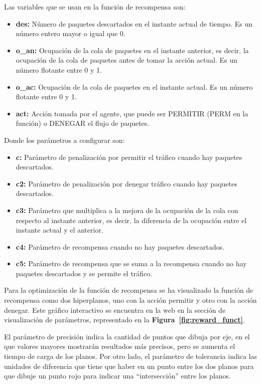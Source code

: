 Las variables que se usan en la función de recompensa son:
\begin{itemize}
    \item \textbf{des:} Número de paquetes descartados en el instante actual de tiempo. Es un número entero mayor o igual que 0.
    \item \textbf{o\_an:} Ocupación de la cola de paquetes en el instante anterior, es decir, la ocupación de la cola de paquetes antes de tomar la acción actual. Es un número flotante entre 0 y 1.
    \item \textbf{o\_ac:} Ocupación de la cola de paquetes en el instante actual. Es un número flotante entre 0 y 1.
    \item \textbf{act:} Acción tomada por el agente, que puede ser PERMITIR (PERM en la función) o DENEGAR el flujo de paquetes.
\end{itemize}

Donde los parámetros a configurar son:
\begin{itemize}
    \item \textbf{c:} Parámetro de penalización por permitir el tráfico cuando hay paquetes descartados.
    \item \textbf{c2:} Parámetro de penalización por denegar tráfico cuando hay paquetes descartados.
    \item \textbf{c3:} Parámetro que multiplica a la mejora de la ocupación de la cola con respecto al instante anterior, es decir, la diferencia de la ocupación entre el instante actual y el anterior.
    \item \textbf{c4:} Parámetro de recompensa cuando no hay paquetes descartados.
    \item \textbf{c5:} Parámetro de recompensa que se suma a la recompensa cuando no hay paquetes descartados y se permite el tráfico.
\end{itemize}

Para la optimización de la función de recompensa se ha visualizado la función de recompensa como dos hiperplanos, uno con la acción permitir y otro con la acción denegar. Este gráfico interactivo se encuentra en la web en la sección de visualización de parámetros, representado en la \textbf{Figura~\ref{fig:reward_funct}}.


El parámetro de precisión indica la cantidad de puntos que dibuja por eje, en el que valores mayores mostrarán resultados más precisos, pero se aumenta el tiempo de carga de los planos. Por otro lado, el parámetro de tolerancia indica las unidades de diferencia que tiene que haber en un punto entre los dos planos para que dibuje un punto rojo para indicar una ``intersección'' entre los planos.


